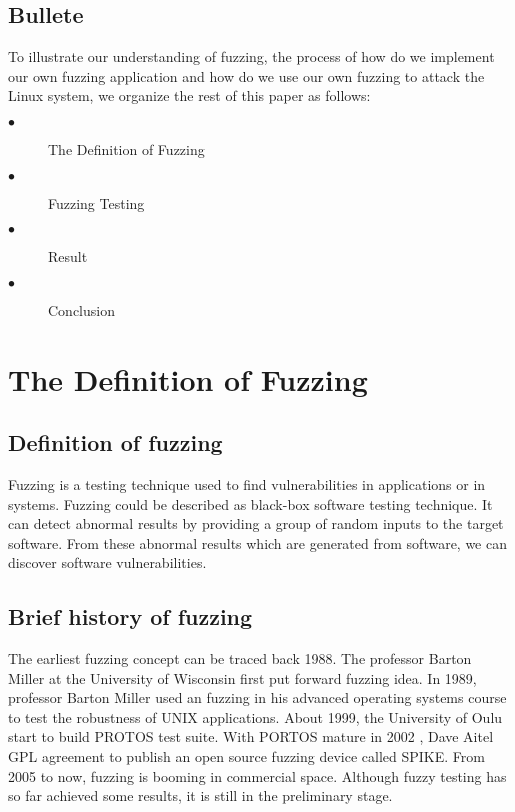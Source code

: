 \documentclass[twoside]{article}
\begin{document}
\begin{multicols}{2}
\subsection{Bullete}
To illustrate our understanding of fuzzing, the process of how do we implement our own fuzzing application and how do we use our own fuzzing to attack the Linux system, we organize the rest of this paper as follows:
\begin{description}
\item[$\bullet$] The Definition of Fuzzing
\item[$\bullet$] Fuzzing Testing
\item[$\bullet$] Result
\item[$\bullet$] Conclusion
\end{description}
\section{The Definition of Fuzzing}
\subsection{Definition of fuzzing}
Fuzzing is a testing technique used to find vulnerabilities in applications or in systems.\cite{sutton2007fuzzing} Fuzzing could be described as black-box software testing technique.\cite{acharya2012bridge} It can detect abnormal results by providing a group of random inputs to the target software. From these abnormal results which are generated from software, we can discover software vulnerabilities.
\subsection{Brief history of fuzzing}
The earliest fuzzing concept can be traced back 1988.\cite{takanen2009fuzzing} The professor Barton Miller at the University of Wisconsin first put forward fuzzing idea. In 1989, professor Barton Miller used an fuzzing in his advanced operating systems course to test the robustness of UNIX applications.  About 1999, the University of Oulu start to build PROTOS test suite. With PORTOS mature in 2002 , Dave Aitel GPL agreement to publish an open source fuzzing device called SPIKE. From 2005 to now, fuzzing is booming in commercial space. Although fuzzy testing has so far achieved some results, it is still in the preliminary stage.\cite{takanen2009fuzzing}

\end{multicols}
\end{document}

